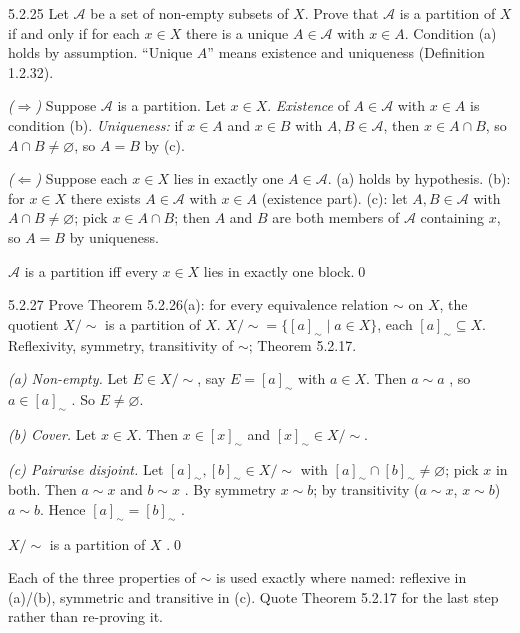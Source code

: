 \begin{bookex}[recommended]{5.2.25}
Let $\mathcal A$ be a set of non-empty subsets of $X$. Prove that $\mathcal A$ is a partition of $X$ if and only if for each $x\in X$ there is a unique $A\in\mathcal A$ with $x\in A$.
\solution
\given Condition (a) holds by assumption. ``Unique $A$'' means existence and uniqueness (Definition 1.2.32).
\begin{steps}
\item \emph{($\Rightarrow$)} Suppose $\mathcal A$ is a partition. Let $x\in X$. \emph{Existence} of $A\in\mathcal A$ with $x\in A$ is condition (b). \emph{Uniqueness:} if $x\in A$ and $x\in B$ with $A,B\in\mathcal A$, then $x\in A\cap B$, so $A\cap B\ne\varnothing$, so $A=B$ by (c).
\item \emph{($\Leftarrow$)} Suppose each $x\in X$ lies in exactly one $A\in\mathcal A$. (a) holds by hypothesis. (b): for $x\in X$ there exists $A\in\mathcal A$ with $x\in A$ (existence part). (c): let $A,B\in\mathcal A$ with $A\cap B\ne\varnothing$; pick $x\in A\cap B$; then $A$ and $B$ are both members of $\mathcal A$ containing $x$, so $A=B$ by uniqueness.
\end{steps}
\conclusion $\mathcal A$ is a partition iff every $x\in X$ lies in exactly one block.\qed
\end{bookex}

\begin{bookex}[essential]{5.2.27}
Prove Theorem 5.2.26(a): for every equivalence relation $\sim$ on $X$, the quotient $X/{\sim}$ is a partition of $X$.
\solution
\given $X/{\sim}=\{[a]_\sim\mid a\in X\}$, each $[a]_\sim\subseteq X$. Reflexivity, symmetry, transitivity of $\sim$; Theorem 5.2.17.
\begin{steps}
\item \emph{(a) Non-empty.} Let $E\in X/{\sim}$, say $E=[a]_\sim$ with $a\in X$. Then $a\sim a$ , so $a\in[a]_\sim$ . So $E\ne\varnothing$.
\item \emph{(b) Cover.} Let $x\in X$. Then $x\in[x]_\sim$  and $[x]_\sim\in X/{\sim}$.
\item \emph{(c) Pairwise disjoint.} Let $[a]_\sim,[b]_\sim\in X/{\sim}$ with $[a]_\sim\cap[b]_\sim\ne\varnothing$; pick $x$ in both. Then $a\sim x$ and $b\sim x$ . By symmetry $x\sim b$; by transitivity ($a\sim x$, $x\sim b$) $a\sim b$. Hence $[a]_\sim=[b]_\sim$ .
\end{steps}
\conclusion $X/{\sim}$ is a partition of $X$ .\qed
\begin{compare}
\item Each of the three properties of $\sim$ is used exactly where named: reflexive in (a)/(b), symmetric and transitive in (c). Quote Theorem 5.2.17 for the last step rather than re-proving it.
\end{compare}
\end{bookex}

